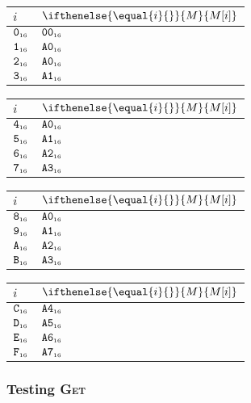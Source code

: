 \documentclass[a4paper,12pt]{article}
\makeatletter
\newcommand{\num}[1]{\texttt{#1}}
\newcommand{\hex}[1]{\num{#1}_{\textup{\tiny 16}}}
\newcommand{\MEM}[1]{\ifthenelse{\equal{#1}{}}{M}{M[#1]}}
\newcommand{\proc}[1]{\textsc{#1}}
\newenvironment{memtable}{%
  \begin{trivlist}
    \item
    }{%
    \end{trivlist}}
\newenvironment{memcolumn}{%
  \begin{tabular}{@{}ll@{}}
    $i$ & $\MEM{i}$ \\
    \hline}
    {%
    \hline
  \end{tabular}}
\newcommand{\memspace}{\qquad}
\makeatother
\begin{document}
\begin{memtable}
  \begin{memcolumn}
    $\hex{0}$ & $\hex{00}$ \\
    $\hex{1}$ & $\hex{A0}$ \\
    $\hex{2}$ & $\hex{A0}$ \\
    $\hex{3}$ & $\hex{A1}$ \\
  \end{memcolumn}
  \memspace
  \begin{memcolumn}
    $\hex{4}$ & $\hex{A0}$ \\
    $\hex{5}$ & $\hex{A1}$ \\
    $\hex{6}$ & $\hex{A2}$ \\
    $\hex{7}$ & $\hex{A3}$ \\
  \end{memcolumn}
  \memspace
  \begin{memcolumn}
    $\hex{8}$ & $\hex{A0}$ \\
    $\hex{9}$ & $\hex{A1}$ \\
    $\hex{A}$ & $\hex{A2}$ \\
    $\hex{B}$ & $\hex{A3}$ \\
  \end{memcolumn}
  \memspace
  \begin{memcolumn}
    $\hex{C}$ & $\hex{A4}$ \\
    $\hex{D}$ & $\hex{A5}$ \\
    $\hex{E}$ & $\hex{A6}$ \\
    $\hex{F}$ & $\hex{A7}$ \\
  \end{memcolumn}
\end{memtable}

\subsubsection{Testing \proc{Get}}
\end{document}
